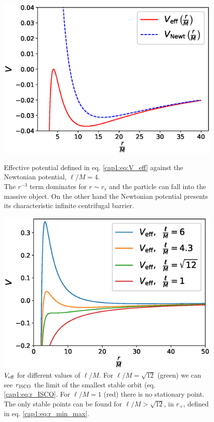 \begin{figure}[h]
\begin{minipage}{0.49 \textwidth}
    \centering
    \includegraphics[width = \textwidth]{Figures/chapter1/V_eff.eps}
    \caption{Effective potential defined in eq. \ref{cap1:eq:V_eff} against the
    Newtonian potential, $\ell / M = 4$. \\
    The $r^{-3}$ term dominates for $r \sim r_s$ and the
    particle can fall into the massive object.
    On the other hand the Newtonian potential presents its characteristic
    infinite centrifugal barrier.}
    \label{cap1:fig:V_effvsVN}
\end{minipage}
\hspace{0.009 \textwidth}
\begin{minipage}{0.49 \textwidth}
    \centering
    \includegraphics[width = \textwidth]{Figures/chapter1/V_eff_tanti.eps}
    \caption{$V_{\rm eff}$ for different values of $\ell / M$.
    For $\ell / M = \sqrt{12}$ (green) we can see $r_{\rm ISCO}$
    the limit of the smallest stable orbit (eq. \ref{cap1:eq:r_ISCO}.
    For $\ell / M = 1$ (red) there is no stationary point.
    The only stable points can be found for $\ell / M > \sqrt{12}$,
    in $r_+$, defined in eq. \ref{cap1:eq:r_min_max}.}
    \label{cap1:fig:V_eff_tanti}
\end{minipage}
\end{figure}


